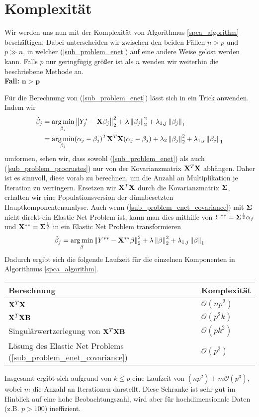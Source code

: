 \section{Komplexität}

Wir werden uns nun mit der Komplexität von Algorithmus \ref{spca_algorithm} beschäftigen. Dabei unterscheiden wir zwischen den beiden Fällen $n > p$ und $p \gg n$, in welcher (\ref{sub_problem_enet}) auf eine andere Weise gelöst werden kann. Falls $p$ nur geringfügig größer ist als $n$ wenden wir weiterhin die beschriebene Methode an.\\

\textbf{Fall: } $\mathbf{n > p}$

Für die Berechnung von (\ref{sub_problem_enet}) lässt sich in ein Trick anwenden. Indem wir
\begin{align}
\label{sub_problem_enet_covariance}
\hat{\beta}_j & = \operatorname*{arg\,min}_{\beta_j} \left\lVert Y_j^* - \mathbf{X} \beta_j \right\rVert_2^2 + \lambda \left\lVert \beta_j \right\rVert_2^2 + \lambda_{1,j}\left\lVert \beta_j \right\rVert_1 \nonumber\\
& = \operatorname*{arg\,min}_{\beta_j} (\alpha_j - \beta_j)^T \mathbf{X}^T \mathbf{X} (\alpha_j - \beta_j) + \lambda_2 \left\lVert \beta_j \right\rVert_2^2 + \lambda_{1,j}\left\lVert \beta_j \right\rVert_1
\end{align}
umformen, sehen wir, dass sowohl (\ref{sub_problem_enet}) als auch (\ref{sub_problem_procrustes}) nur von der Kovarianzmatrix $\mathbf{X}^T \mathbf{X}$ abhängen. Daher ist es sinnvoll, diese vorab zu berechnen, um die Anzahl an Multiplikation je Iteration zu verringern. Ersetzen wir $\mathbf{X}^T\mathbf{X}$ durch die Kovarianzmatrix $\mathbf{\Sigma}$, erhalten wir eine Populationsversion der dünnbesetzten Hauptkomponentenanalyse. Auch wenn (\ref{sub_problem_enet_covariance}) mit $\mathbf{\Sigma}$ nicht direkt ein Elastic Net Problem ist, kann man dies mithilfe von $Y^{**} = \mathbf{\Sigma}^{\frac{1}{2}} \alpha_j$ und $\mathbf{X}^{**} = \mathbf{\Sigma}^{\frac{1}{2}}$ in ein Elastic Net Problem transformieren
$$\hat{\beta}_j = \operatorname*{arg\,min}_{\beta} \left\lVert Y^{**} - \mathbf{X}^{**} \beta \right\rVert_2^2 + \lambda \left\lVert \beta \right\rVert_2^2 + \lambda_{1,j}\left\lVert \beta \right\rVert_1$$
Dadurch ergibt sich die folgende Laufzeit für die einzelnen Komponenten in Algorithmus \ref{spca_algorithm}.
\begin{center}
\begin{tabular}{ll}
Berechnung & Komplexität\\\hline\hspace{0.2cm}
$\mathbf{X}^T\mathbf{X}$ & $\mathcal{O}(np^2)$\\
$\mathbf{X}^T\mathbf{X} \mathbf{B}$ & $\mathcal{O}(p^2k)$\\
Singulärwertzerlegung von $\mathbf{X}^T\mathbf{X} \mathbf{B}$ & $\mathcal{O}(pk^2)$\\
Lösung des Elastic Net Problems (\ref{sub_problem_enet_covariance}) & $\mathcal{O}(p^3)$
\end{tabular}
\end{center}
Insgesamt ergibt sich aufgrund von $k \leq p$ eine Laufzeit von $(np^2) + m\mathcal{O}(p^3)$, wobei $m$ die Anzahl an Iterationen darstellt. Diese Schranke ist sehr gut im Hinblick auf eine hohe Beobachtungszahl, wird aber für hochdimensionale Daten (z.B. $p > 100$) ineffizient.\\

